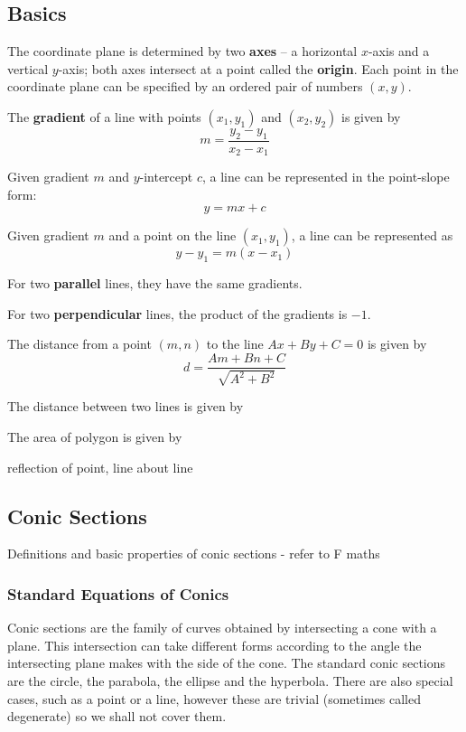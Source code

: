 \subsection{Basics}
The coordinate plane is determined by two \textbf{axes} -- a horizontal $x$-axis and a vertical $y$-axis; both axes intersect at a point called the \textbf{origin}. Each point in the coordinate plane can be specified by an ordered pair of numbers $(x,y)$.

The \textbf{gradient} of a line with points $(x_1, y_1)$ and $(x_2, y_2)$ is given by
\begin{equation}
m = \frac{y_2-y_1}{x_2-x_1}
\end{equation}

Given gradient $m$ and $y$-intercept $c$, a line can be represented in the point-slope form:
\begin{equation}
y=mx+c
\end{equation}

Given gradient $m$ and a point on the line $(x_1,y_1)$, a line can be represented as
\begin{equation}
y-y_1=m(x-x_1)
\end{equation}

For two \textbf{parallel} lines, they have the same gradients.

For two \textbf{perpendicular} lines, the product of the gradients is $-1$.

The distance from a point $(m, n)$ to the line $Ax + By + C = 0$ is given by
\[ d = \frac{Am+Bn+C}{\sqrt{A^2+B^2}} \]

The distance between two lines is given by


The area of polygon is given by


reflection of point, line about line

\subsection{Conic Sections}
Definitions and basic properties of conic sections - refer to F maths
\subsubsection{Standard Equations of Conics}
Conic sections are the family of curves obtained by intersecting a cone with a plane. This intersection can take different forms according to the angle the intersecting plane makes with the side of the cone. The standard conic sections are the circle, the parabola, the ellipse and the hyperbola. There are also special cases, such as a point or a line, however these are trivial (sometimes called degenerate) so we shall not cover them.

